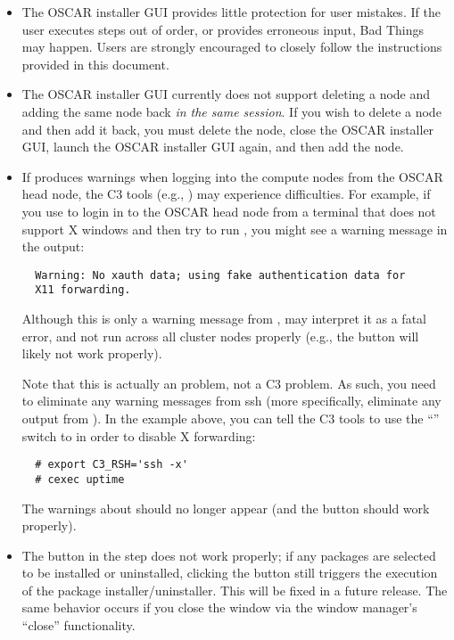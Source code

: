 \begin{itemize}
\item The OSCAR installer GUI provides little protection for user
  mistakes.  If the user executes steps out of order, or provides
  erroneous input, Bad Things may happen.  Users are strongly
  encouraged to closely follow the instructions provided in this
  document.

\item The OSCAR installer GUI currently does not support deleting a
  node and adding the same node back {\em in the same session}.  If
  you wish to delete a node and then add it back, you must delete the
  node, close the OSCAR installer GUI, launch the OSCAR installer GUI
  again, and then add the node.

\item If  produces warnings when logging into the compute
  nodes from the OSCAR head node, the C3 tools (e.g., ) may
  experience difficulties.  For example, if you use  to login
  in to the OSCAR head node from a terminal that does not support X
  windows and then try to run , you might see a warning
  message in the  output:

\begin{verbatim}
  Warning: No xauth data; using fake authentication data for
  X11 forwarding.
\end{verbatim}

  Although this is only a warning message from , 
  may interpret it as a fatal error, and not run across all cluster
  nodes properly (e.g., the  button
  will likely not work properly).

  Note that this is actually an  problem, not a C3 problem.
  As such, you need to eliminate any warning messages from ssh (more
  specifically, eliminate any output from ).  In the
  example above, you can tell the C3 tools to use the ``''
  switch to  in order to disable X forwarding:

\begin{verbatim}
  # export C3_RSH='ssh -x'
  # cexec uptime
\end{verbatim}

  The warnings about  should no longer appear (and the
   button should work properly).

\item The  button in the  step does not work properly; if any packages are selected
  to be installed or uninstalled, clicking the  button
  still triggers the execution of the package installer/uninstaller.
  This will be fixed in a future release.  The same behavior occurs if
  you close the window via the window manager's ``close''
  functionality.


\end{itemize}
